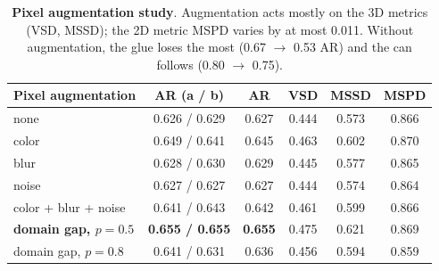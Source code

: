 \begin{table}[h]
  \centering
  \setlength{\tabcolsep}{3.5pt}
  \footnotesize
  \begin{tabular}{lccccc}
    \toprule
    Pixel augmentation & AR (a / b) & AR & VSD & MSSD & MSPD \\
    \midrule
    none & 0.626 / 0.629 & 0.627 & 0.444 & 0.573 & 0.866 \\
    color & 0.649 / 0.641 & 0.645 & 0.463 & 0.602 & 0.870 \\
    blur & 0.628 / 0.630 & 0.629 & 0.445 & 0.577 & 0.865 \\
    noise & 0.627 / 0.627 & 0.627 & 0.444 & 0.574 & 0.864 \\
    color + blur + noise & 0.641 / 0.643 & 0.642 & 0.461 & 0.599 & 0.866 \\
    \textbf{domain gap, $p = 0.5$} & \textbf{0.655 / 0.655} & \textbf{0.655} & 0.475 & 0.621 & 0.869 \\
    domain gap, $p = 0.8$ & 0.641 / 0.631 & 0.636 & 0.456 & 0.594 & 0.859 \\
    \bottomrule
  \end{tabular}
  \caption{\textbf{Pixel augmentation study}. Augmentation acts mostly on the 3D metrics (VSD,
  MSSD); the 2D metric MSPD varies by at most 0.011. Without augmentation, the glue loses the most
  (0.67 $\rightarrow$ 0.53 AR) and the can follows (0.80 $\rightarrow$ 0.75).}
  \label{tab:supp:aug}
\end{table}

